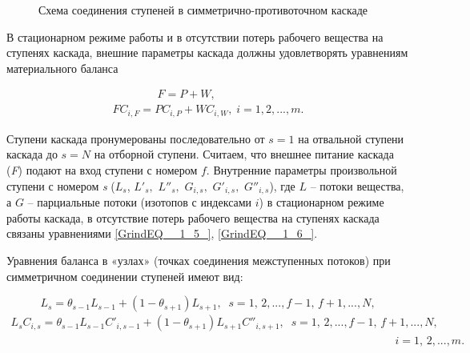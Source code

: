 \begin{figure}[ht]
  \caption{Схема соединения ступеней в симметрично-противоточном каскаде}\label{1_2}
\end{figure}

В стационарном режиме работы и в отсутствии потерь рабочего вещества на ступенях каскада, внешние параметры каскада должны удовлетворять уравнениям материального баланса

\begin{equation} \label{GrindEQ__1_21_} 
  \begin{array}{l} {\quad \quad \quad \quad F=P+W,} \\ {FC_{i,F} =PC_{i,P} +WC_{i,W} ,\; i=1,2,...,m.} \end{array} 
\end{equation} 

Ступени каскада пронумерованы последовательно от $s=1$ на отвальной ступени каскада до $s=N$ на отборной ступени. Считаем, что внешнее питание каскада (\textit{F}) подают на вход ступени с номером $f$. Внутренние параметры произвольной ступени с номером \textit{s} ($L_{s} $, $L'_{s} ,$ $L''_{s} ,$ $G_{i,s} ,$ $G'_{i,s} ,$ $G''_{i,s} $), где $L$ -- потоки вещества, а $G$ -- парциальные потоки (изотопов с индексами $i$) в стационарном режиме работы каскада, в отсутствие потерь рабочего вещества на ступенях каскада связаны уравнениями \ref{GrindEQ__1_5_},  \ref{GrindEQ__1_6_}.

Уравнения баланса в «узлах» (точках соединения межступенных потоков) при симметричном соединении ступеней имеют вид:

\begin{equation} \label{GrindEQ__1_24_} 
  L_{s} =\theta _{s-1} L_{s-1} +(1-\theta _{s+1} )L_{s+1} ,\; \; s=1,\, 2,...,f-1,\, f+1,...,N, 
  \end{equation} 
  \begin{equation} \label{GrindEQ__1_25_} 
  \begin{array}{l} {L_{s} C_{i,s} =\theta _{s-1} L_{s-1} C'_{i,s-1} +(1-\theta _{s+1} )L_{s+1} C''_{i,s+1} ,\; \; s=1,\, 2,...,f-1,\, f+1,...,N,} \\ {\; \; \; \; \; \; \; \; \; \; \; \; \; \; \; \; \; \; \; \; \; \; \; \; \; \; \; \; \; \; \; \; \; \quad \quad \quad \quad \quad \; \; \; \; \; \; \; \; \; \; \; \; \; \quad \quad \quad \; \; \; \; \; \; \; \; \; \; \; \; \; \quad \quad \quad \; \; \; \; \; \; \; \; \; \; \; \; \; \quad \quad \; \quad i=1,\, 2,...,m.} \end{array} 
\end{equation} 

